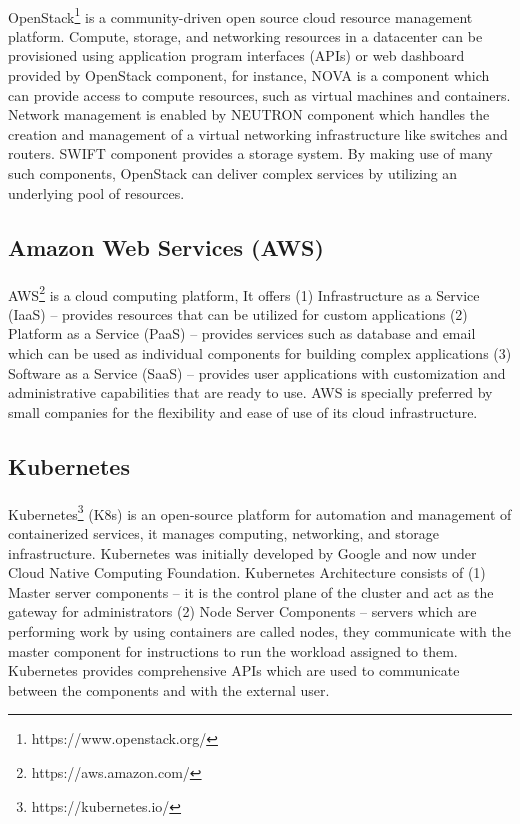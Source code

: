 \paragraph{}
OpenStack\footnote{https://www.openstack.org/} is a community-driven open source cloud resource management platform. Compute, storage, and networking resources in a datacenter can be provisioned using application program interfaces (APIs) or web dashboard provided by OpenStack component, for instance, NOVA is a component which can provide access to compute resources, such as virtual machines and containers. Network management is enabled by NEUTRON component which handles the creation and management of a virtual networking infrastructure like switches and routers. SWIFT component provides a storage system. By making use of many such components, OpenStack can deliver complex services by utilizing an underlying pool of resources.

\subsection{Amazon Web Services (AWS)}

\paragraph{}
AWS\footnote{https://aws.amazon.com/} is a cloud computing platform, It offers (1) Infrastructure as a Service (IaaS) -- provides resources that can be utilized for custom applications (2) Platform as a Service (PaaS) -- provides services such as database and email which can be used as individual components for building complex applications (3) Software as a Service (SaaS) -- provides user applications with customization and administrative capabilities that are ready to use. AWS is specially preferred by small companies for the flexibility and ease of use of its cloud infrastructure.

\subsection{Kubernetes}

\paragraph{}
Kubernetes\footnote{https://kubernetes.io/} (K8s) is an open-source platform for automation and management of containerized services, it manages computing, networking, and storage infrastructure. Kubernetes was initially developed by Google and now under Cloud Native Computing Foundation. Kubernetes Architecture consists of (1) Master server components -- it is the control plane of the cluster and act as the gateway for  administrators (2) Node Server Components -- servers which are performing work by using containers are called nodes, they communicate with the master component for instructions to run the workload assigned to them. Kubernetes provides comprehensive APIs which are used to communicate between the components and with the external user.



